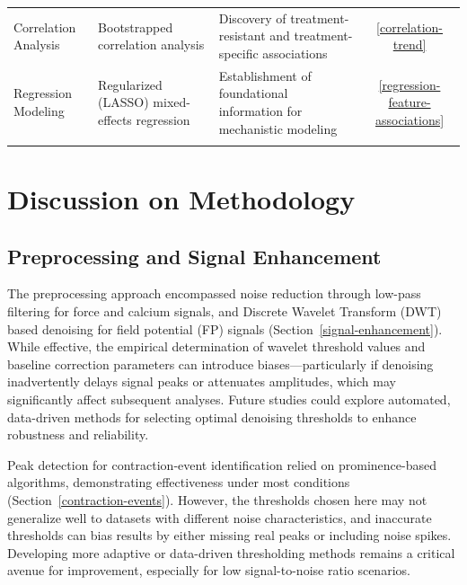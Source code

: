 \documentclass{report}
\begin{document}
\begin{table}[htbp]
\begin{tabularx}{\textwidth}{@{}>{\raggedright}p{3.5cm}>{\raggedright}p{4.8cm}>{\raggedright}p{3.9cm}c@{}}
        Correlation Analysis & Bootstrapped correlation analysis & 
        Discovery of treatment-resistant and treatment-specific associations & \ref{correlation-trend} \\ \addlinespace[5pt]
        
        Regression Modeling & Regularized (LASSO) mixed-effects regression & 
        Establishment of foundational information for mechanistic modeling & \ref{regression-feature-associations} \\ \addlinespace[5pt]
        
        \bottomrule
    \end{tabularx}
\end{table}



    
    \section{Discussion on Methodology}
    
    \subsection{Preprocessing and Signal Enhancement}
   The preprocessing approach encompassed noise reduction through low-pass filtering for force and calcium signals, and Discrete Wavelet Transform (DWT) based denoising for field potential (FP) signals (Section~\ref{signal-enhancement}). While effective, the empirical determination of wavelet threshold values and baseline correction parameters can introduce biases—particularly if denoising inadvertently delays signal peaks or attenuates amplitudes, which may significantly affect subsequent analyses. Future studies could explore automated, data-driven methods for selecting optimal denoising thresholds to enhance robustness and reliability.

    Peak detection for contraction-event identification relied on prominence-based algorithms, demonstrating effectiveness under most conditions (Section~\ref{contraction-events}). However, the thresholds chosen here may not generalize well to datasets with different noise characteristics, and inaccurate thresholds can bias results by either missing real peaks or including noise spikes. Developing more adaptive or data-driven thresholding methods remains a critical avenue for improvement, especially for low signal-to-noise ratio scenarios.
    
    
    
\end{document}
